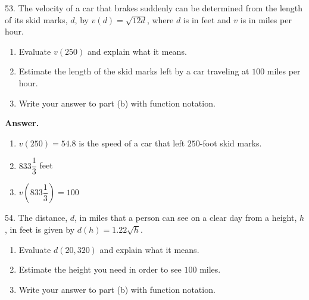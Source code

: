 \documentclass[10pt,]{book}
\theoremstyle{plain}
\theoremstyle{definition}
\theoremstyle{definition}
\theoremstyle{definition}
\begin{document}
\begin{exerciselist}
\begin{enumerate}[label=\alph*]
\end{enumerate}
%
\par\smallskip
\item[53.]\hypertarget{exercise-63}{}The velocity of a car that brakes suddenly can be determined from the length of its skid marks, \(d\), by \(v(d) = \sqrt{12d}\), where \(d\) is in feet and \(v\) is in miles per hour. \leavevmode%
\begin{enumerate}[label=\alph*]
\item\hypertarget{li-213}{}Evaluate \(v(250)\) and explain what it means.%
\item\hypertarget{li-214}{}Estimate the length of the skid marks left by a car traveling at \(100\) miles per hour.%
\item\hypertarget{li-215}{}Write your answer to part (b) with function notation.%
\end{enumerate}
%
\par\smallskip
\par\smallskip
\noindent\textbf{Answer.}\hypertarget{answer-37}{}\quad
\leavevmode%
\begin{enumerate}[label=\alph*]
\item\hypertarget{li-216}{}\(v(250) = 54.8\) is the speed of a car that left \(250\)-foot skid marks.%
\item\hypertarget{li-217}{}\(833\dfrac{1}{3}\) feet%
\item\hypertarget{li-218}{}\(v\left(833\dfrac{1}{3}\right)= 100\)%
\end{enumerate}
%
\item[54.]\hypertarget{exercise-64}{}The distance, \(d\), in miles that a person can see on a clear day from a height, \(h\), in feet is given by \(d(h) = 1.22\sqrt{h}\). \leavevmode%
\begin{enumerate}[label=\alph*]
\item\hypertarget{li-219}{}Evaluate \(d(20,320)\) and explain what it means.%
\item\hypertarget{li-220}{}Estimate the height you need in order to see \(100\) miles.%
\item\hypertarget{li-221}{}Write your answer to part (b) with function notation.%
\end{enumerate}
%
\par\smallskip

\end{exerciselist}
\end{document}
